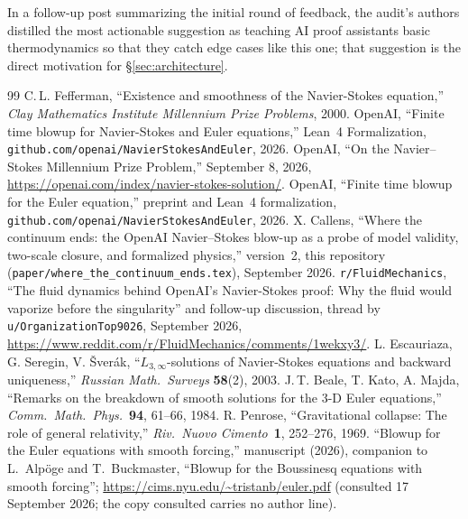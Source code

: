 \documentclass[11pt,a4paper]{article}
\begin{document}
In a follow-up post summarizing the initial round of feedback, the audit's authors distilled the
most actionable suggestion as teaching AI proof assistants basic thermodynamics so that they catch
edge cases like this one; that suggestion is the direct motivation for \S\ref{sec:architecture}.

\begin{thebibliography}{99}
  C.\,L. Fefferman, ``Existence and smoothness of the Navier-Stokes equation,''
  \emph{Clay Mathematics Institute Millennium Prize Problems}, 2000.
  OpenAI, ``Finite time blowup for Navier-Stokes and Euler equations,''
  Lean~4 Formalization, \texttt{github.com/openai/NavierStokesAndEuler}, 2026.
  OpenAI, ``On the Navier--Stokes Millennium Prize Problem,'' September 8, 2026,
  \url{https://openai.com/index/navier-stokes-solution/}.
  OpenAI, ``Finite time blowup for the Euler equation,''
  preprint and Lean~4 formalization, \texttt{github.com/openai/NavierStokesAndEuler}, 2026.
  X. Callens, ``Where the continuum ends: the OpenAI Navier--Stokes blow-up as a probe of model
  validity, two-scale closure, and formalized physics,'' version~2, this repository
  (\texttt{paper/where\_the\_continuum\_ends.tex}), September 2026.
  \texttt{r/FluidMechanics}, ``The fluid dynamics behind OpenAI's Navier-Stokes proof: Why the
  fluid would vaporize before the singularity'' and follow-up discussion, thread by
  \texttt{u/OrganizationTop9026}, September 2026,
  \url{https://www.reddit.com/r/FluidMechanics/comments/1wekxy3/}.
  L. Escauriaza, G. Seregin, V. \v{S}ver\'{a}k,
  ``$L_{3,\infty}$-solutions of Navier-Stokes equations and backward uniqueness,''
  \emph{Russian Math.\ Surveys} \textbf{58}(2), 2003.
  J.\,T. Beale, T. Kato, A. Majda,
  ``Remarks on the breakdown of smooth solutions for the 3-D Euler equations,''
  \emph{Comm.\ Math.\ Phys.}\ \textbf{94}, 61--66, 1984.
  R. Penrose,
  ``Gravitational collapse: The role of general relativity,''
  \emph{Riv.\ Nuovo Cimento}\ \textbf{1}, 252--276, 1969.
  ``Blowup for the Euler equations with smooth forcing,'' manuscript (2026), companion to
  L.~Alp\"oge and T.~Buckmaster, ``Blowup for the Boussinesq equations with smooth forcing'';
  \url{https://cims.nyu.edu/~tristanb/euler.pdf} (consulted 17 September 2026; the copy consulted
  carries no author line).


\end{thebibliography}
\end{document}
